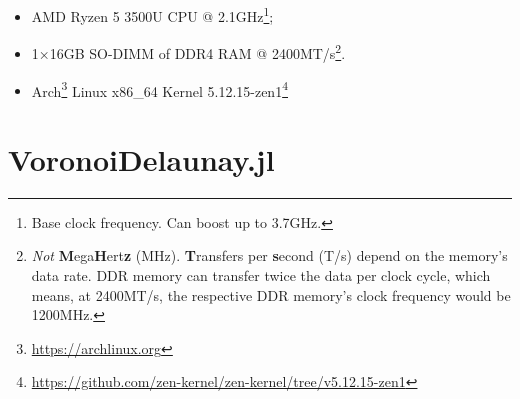 \begin{itemize}
  \label{acro:AMD}
  \label{acro:CPU}
  \item \ac{AMD} Ryzen\textsuperscript{\texttrademark} 5 3500U \ac{CPU} @
  2.1GHz\footnote{Base clock frequency.  Can boost up to 3.7GHz.};
  \label{acro:SO-DIMM}
  \label{acro:DDR}
  \label{acro:RAM}
  \item 1×16GB \ac{SO-DIMM} of \ac{DDR}4 \ac{RAM} @ 2400MT/s\footnote{\emph{Not}
  \textbf{M}ega\textbf{H}ert\textbf{z} (MHz).  \textbf{T}ransfers per
  \textbf{s}econd (T/s) depend on the memory's data rate.  \acf{DDR} memory can
  transfer twice the data per clock cycle, which means, at 2400MT/s, the
  respective \ac{DDR} memory's clock frequency would be 1200MHz.}.
  \item Arch\footnote{\url{https://archlinux.org}}
  Linux\textsuperscript{\textregistered} x86\_64 Kernel
  5.12.15-zen1\footnote{\url{https://github.com/zen-kernel/zen-kernel/tree/v5.12.15-zen1}}
\end{itemize}
\clearpage



\section{VoronoiDelaunay.jl}%
\label{sec:eval.vdjl}



